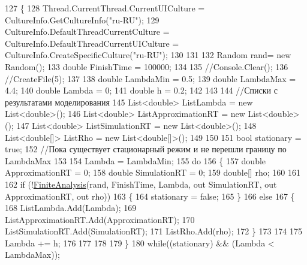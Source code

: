 \begin{DoxyCode}
127         \{
128             Thread.CurrentThread.CurrentUICulture = CultureInfo.GetCultureInfo(\textcolor{stringliteral}{"ru-RU"});
129             CultureInfo.DefaultThreadCurrentCulture = CultureInfo.DefaultThreadCurrentUICulture = 
      CultureInfo.CreateSpecificCulture(\textcolor{stringliteral}{"ru-RU"});
130 
131 
132             Random rand= \textcolor{keyword}{new} Random(); 
133             \textcolor{keywordtype}{double} FinishTime = 100000;  
134 
135             \textcolor{comment}{//Console.Clear(); }
136             \textcolor{comment}{//CreateFile(5); }
137 
138             \textcolor{keywordtype}{double} LambdaMin = 0.5; 
139             \textcolor{keywordtype}{double} LambdaMax = 4.4; 
140             \textcolor{keywordtype}{double} Lambda = 0; 
141             \textcolor{keywordtype}{double} h = 0.2; 
142 
143 
144             \textcolor{comment}{//Списки с результатами моделирования}
145             List<double> ListLambda = \textcolor{keyword}{new} List<double>(); 
146             List<double> ListApproximationRT = \textcolor{keyword}{new} List<double>(); 
147             List<double> ListSimulationRT = \textcolor{keyword}{new} List<double>(); 
148             List<double[]> ListRho = \textcolor{keyword}{new} List<double[]>(); 
149 
150 
151             \textcolor{keywordtype}{bool} stationary = \textcolor{keyword}{true}; 
152             \textcolor{comment}{//Пока существует стационарный режим и не перешли границу по LambdaMax}
153 
154             Lambda = LambdaMin; 
155             \textcolor{keywordflow}{do}
156             \{
157                 \textcolor{keywordtype}{double} ApproximationRT = 0; 
158                 \textcolor{keywordtype}{double} SimulationRT = 0; 
159                 \textcolor{keywordtype}{double}[] rho; 
160 
161 
162                 \textcolor{keywordflow}{if} (!\hyperlink{class_analysis_1_1_program_a1d8b267dd093b57dc83268ebd548a73a}{FiniteAnalysis}(rand, FinishTime, Lambda,  out SimulationRT, out 
      ApproximationRT, out rho))
163                 \{
164                     stationary = \textcolor{keyword}{false}; 
165                 \}
166                 \textcolor{keywordflow}{else}
167                 \{
168                     ListLambda.Add(Lambda); 
169                     ListApproximationRT.Add(ApproximationRT);
170                     ListSimulationRT.Add(SimulationRT); 
171                     ListRho.Add(rho); 
172                 \}
173 
174 
175                 Lambda += h; 
176 
177 
178 
179             \}
180             \textcolor{keywordflow}{while}((stationary) && (Lambda < LambdaMax));

\end{DoxyCode}
